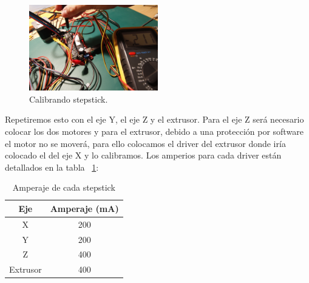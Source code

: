 		\begin{figure}[H]
			\centering
			\includegraphics[width=0.5\textwidth]{../../Fotos/23.jpg}
			\caption{Calibrando stepstick.}
			\label{fig:calibrando.stepstick}
		\end {figure}
			Repetiremos esto con el eje Y, el eje Z y el extrusor. Para el eje Z será necesario colocar los dos motores y para el extrusor, debido a una protección por software el motor no se moverá, para ello colocamos el driver del extrusor donde iría colocado el del eje X y lo calibramos. Los amperios para cada driver están detallados en la tabla ~\ref{tab:amperios.stepstick}:
			\begin{table}[H]
				\centering
			\begin{tabular}{|c|c|}
			\hline
			Eje & Amperaje (mA) \\
			\hline
				X & 200 \\
			\hline
				Y & 200 \\
			\hline
				Z & 400 \\
			\hline
				Extrusor & 400 \\
			\hline
			\end{tabular}
			\caption{Amperaje de cada stepstick}
			\label{tab:amperios.stepstick}
			\end{table}